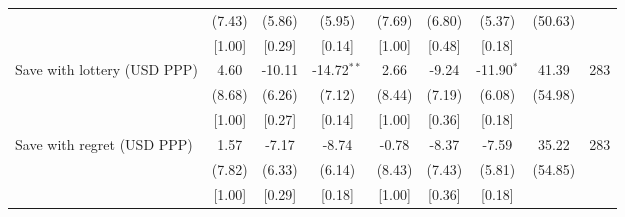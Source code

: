 \begin{table}[h]
{\begin{threeparttable}
\begin{tabular}{l*{8}{c}}
          &   (7.43)&   (5.86)&   (5.95)&   (7.69)&   (6.80)&   (5.37)&  (50.63)&         \\
          &   [1.00]&   [0.29]&   [0.14]&   [1.00]&   [0.48]&   [0.18]&         &         \\
Save with lottery (USD PPP)&     4.60&   -10.11&-14.72$^{**}$&     2.66&    -9.24&-11.90$^{*}$&    41.39&      283\\
          &   (8.68)&   (6.26)&   (7.12)&   (8.44)&   (7.19)&   (6.08)&  (54.98)&         \\
          &   [1.00]&   [0.27]&   [0.14]&   [1.00]&   [0.36]&   [0.18]&         &         \\
Save with regret (USD PPP)&     1.57&    -7.17&    -8.74&    -0.78&    -8.37&    -7.59&    35.22&      283\\
          &   (7.82)&   (6.33)&   (6.14)&   (8.43)&   (7.43)&   (5.81)&  (54.85)&         \\
          &   [1.00]&   [0.29]&   [0.18]&   [1.00]&   [0.36]&   [0.18]&         &         \\
\bottomrule \end{tabular} \begin{tablenotes}[flushleft] \footnotesize \item  \end{tablenotes} \end{threeparttable} } \end{table}
